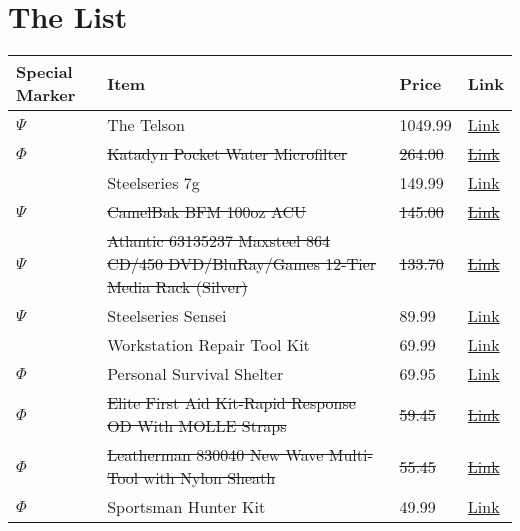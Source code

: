 \documentclass[12pt]{article}
\begin{document}
\section*{The List}
\begin{longtable}{ | p{1.3cm} | p{12cm} | l | l |}
\hline
Special Marker & Item & Price & Link \\
\hline
$\Psi$ & The Telson & 1049.99 & \href{http://www.scorpyd.com/store.html}{Link} \\
\sout{$\Phi$} & \sout{Katadyn Pocket Water Microfilter} & \sout{264.00} & \href{http://www.amazon.com/Katadyn-8013618-Pocket-Water-Microfilter/dp/B0007U00YE/ref=wl_it_dp_o_npd?ie=UTF8&coliid=I303G9NWK6X6AR&colid=8BFL6AZQK4C2}{\sout{Link}} \\
& Steelseries 7g  &  149.99 & \href{http://shop.steelseries.com/us/keyboards/steelseries-7g.html}{Link} \\
\sout{$\Psi$} & \sout{CamelBak BFM 100oz ACU} & \sout{145.00} & \href{http://www.amazon.com/CamelBak-61070-BFM-100oz-ACU/dp/B002QW7D8M/ref=sr_1_6?ie=UTF8&qid=1323054264&sr=8-6}{\sout{Link}} \\
\sout{$\Psi$} & \sout{Atlantic 63135237 Maxsteel 864 CD/450 DVD/BluRay/Games 12-Tier Media Rack (Silver)} & \sout{133.70} & \href{http://www.amazon.com/Atlantic-63135237-Maxsteel-BluRay-12-Tier/dp/B000A0FXCK}{\sout{Link}} \\
$\Psi$ & Steelseries Sensei  & 89.99 & \href{http://shop.steelseries.com/us/mice/steelseries-sensei.html}{Link} \\
& Workstation Repair Tool Kit & 69.99 & \href{http://www.thinkgeek.com/gadgets/tools/7048/}{Link} \\
$\Phi$ & Personal Survival Shelter & 69.95 & \href{http://wildernessinnovation.com/survival-supplies/survival-items/personal-survival-shelter/}{Link} \\
\sout{$\Phi$} & \sout{Elite First Aid Kit-Rapid Response OD With MOLLE Straps} & \sout{59.45} & \href{http://www.amazon.com/Elite-Kit-Rapid-Response-Wrapped-Contains/dp/B005G2GXOE/ref=sr_1_1?s=outdoor-recreation&ie=UTF8&qid=1323051713&sr=1-1}{\sout{Link}} \\
\sout{$\Phi$} & \sout{Leatherman 830040 New Wave Multi-Tool with Nylon Sheath} & \sout{55.45} & \href{http://www.amazon.com/Leatherman-830040-Multi-Tool-Nylon-Sheath/dp/B0002H49BM/ref=sr_1_1?s=hi&ie=UTF8&qid=1323051941&sr=1-1}{\sout{Link}} \\
$\Phi$ & Sportsman Hunter Kit & 49.99 & \href{http://www.amazon.com/Shepherd-Survival-Supply-Sportsman-Hunter/dp/B0055S6LQO/ref=sr_1_3?s=sporting-goods&ie=UTF8&qid=1324836457&sr=1-3}{Link} \\

\end{longtable}
\end{document}
